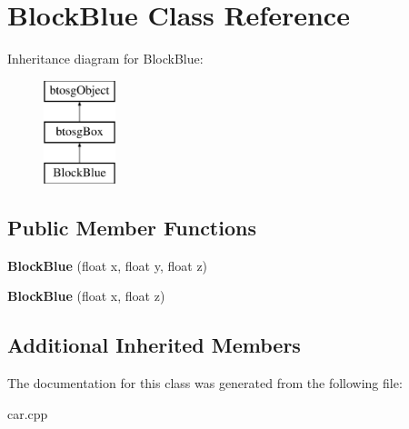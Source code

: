 \hypertarget{classBlockBlue}{}\section{Block\+Blue Class Reference}
\label{classBlockBlue}
Inheritance diagram for Block\+Blue\+:\begin{figure}[H]
\begin{center}
\leavevmode
\includegraphics[height=3.000000cm]{classBlockBlue}
\end{center}
\end{figure}
\subsection*{Public Member Functions}
\begin{DoxyCompactItemize}
\item 
\mbox{\label{classBlockBlue_a1a4b2179c0dd23119a29eb8904bfcec8}} 
{\bfseries Block\+Blue} (float x, float y, float z)
\item 
\mbox{\label{classBlockBlue_a00e217a3fbf526424611409135f85b74}} 
{\bfseries Block\+Blue} (float x, float z)
\end{DoxyCompactItemize}
\subsection*{Additional Inherited Members}


The documentation for this class was generated from the following file\+:\begin{DoxyCompactItemize}
\item 
car.\+cpp\end{DoxyCompactItemize}
